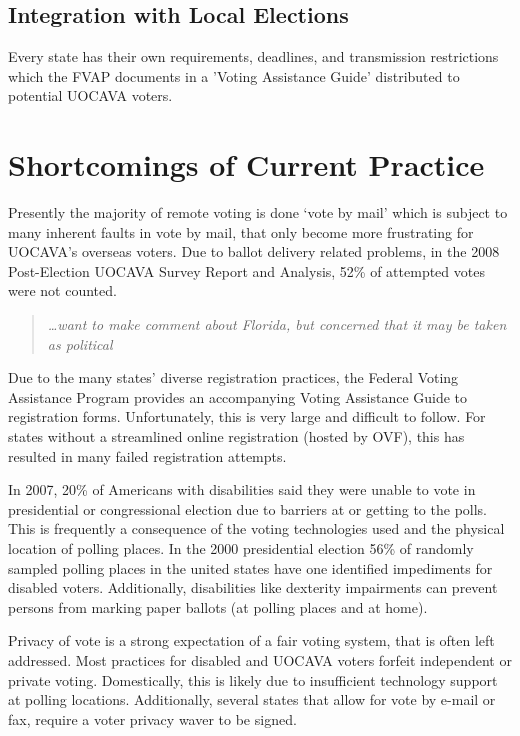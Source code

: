 \subsection{Integration with Local Elections}

Every state has their own requirements, deadlines, and transmission restrictions which the FVAP documents in a 'Voting Assistance Guide' distributed to potential UOCAVA voters. 

\section{Shortcomings of Current Practice}

Presently the majority of remote voting is done `vote by mail'  which is subject to many inherent faults in vote by mail, that only become more frustrating for UOCAVA's overseas voters. Due to ballot delivery related problems, in the 2008 Post-Election UOCAVA Survey Report and Analysis, 52\% of attempted votes were not counted. \begin{quote} {\em \ldots want to make comment about Florida, but concerned that it may be taken as political}\end{quote}

Due to the many states' diverse registration practices, the Federal Voting Assistance Program provides an accompanying Voting Assistance Guide to registration forms. Unfortunately, this is very large and difficult to follow. For states without a streamlined online registration (hosted by OVF), this has resulted in many failed registration attempts.


In 2007, 20\% of Americans with disabilities said they were unable to vote in presidential or congressional election due to barriers at or getting to the polls. This is frequently a consequence of the voting technologies used and the physical location of polling places. In the 2000 presidential election 56\% of randomly sampled polling places in the united states have one identified impediments for disabled voters. Additionally, disabilities like dexterity impairments can prevent persons from marking paper ballots (at polling places and at home).

Privacy of vote is a strong expectation of a fair voting system, that is often left addressed. Most practices for disabled and UOCAVA voters forfeit independent or private voting. Domestically, this is likely due to insufficient technology support at polling locations. Additionally, several states that allow for vote by e-mail or fax, require a voter privacy waver to be signed.

